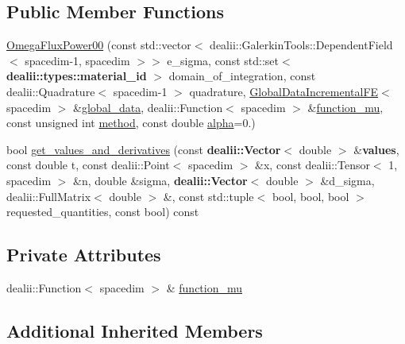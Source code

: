 \subsection*{Public Member Functions}
\begin{DoxyCompactItemize}
\item 
\hyperlink{classincremental_f_e_1_1_omega_flux_power00_a90bd37bed7609d188bc543ecd466e198}{Omega\+Flux\+Power00} (const std\+::vector$<$ dealii\+::\+Galerkin\+Tools\+::\+Dependent\+Field$<$ spacedim-\/1, spacedim $>$$>$ e\+\_\+sigma, const std\+::set$<$ {\bf dealii\+::types\+::material\+\_\+id} $>$ domain\+\_\+of\+\_\+integration, const dealii\+::\+Quadrature$<$ spacedim-\/1 $>$ quadrature, \hyperlink{classincremental_f_e_1_1_global_data_incremental_f_e}{Global\+Data\+Incremental\+FE}$<$ spacedim $>$ \&\hyperlink{classincremental_f_e_1_1_omega_abd23d288a7a4a43f9b528be968cd2113}{global\+\_\+data}, dealii\+::\+Function$<$ spacedim $>$ \&\hyperlink{classincremental_f_e_1_1_omega_flux_power00_a9b8beb230f2a0609646ddebe08c1c236}{function\+\_\+mu}, const unsigned int \hyperlink{classincremental_f_e_1_1_omega_a7600d263ebf98129629e44fa67e8a58c}{method}, const double \hyperlink{classincremental_f_e_1_1_omega_a891688560ec0ad8dc5a0058a7b400269}{alpha}=0.)
\item 
bool \hyperlink{classincremental_f_e_1_1_omega_flux_power00_abbcdc6c23167a34199401338b7fe058f}{get\+\_\+values\+\_\+and\+\_\+derivatives} (const {\bf dealii\+::\+Vector}$<$ double $>$ \&{\bf values}, const double t, const dealii\+::\+Point$<$ spacedim $>$ \&x, const dealii\+::\+Tensor$<$ 1, spacedim $>$ \&n, double \&sigma, {\bf dealii\+::\+Vector}$<$ double $>$ \&d\+\_\+sigma, dealii\+::\+Full\+Matrix$<$ double $>$ \&, const std\+::tuple$<$ bool, bool, bool $>$ requested\+\_\+quantities, const bool) const 
\end{DoxyCompactItemize}
\subsection*{Private Attributes}
\begin{DoxyCompactItemize}
\item 
dealii\+::\+Function$<$ spacedim $>$ \& \hyperlink{classincremental_f_e_1_1_omega_flux_power00_a9b8beb230f2a0609646ddebe08c1c236}{function\+\_\+mu}
\end{DoxyCompactItemize}
\subsection*{Additional Inherited Members}


